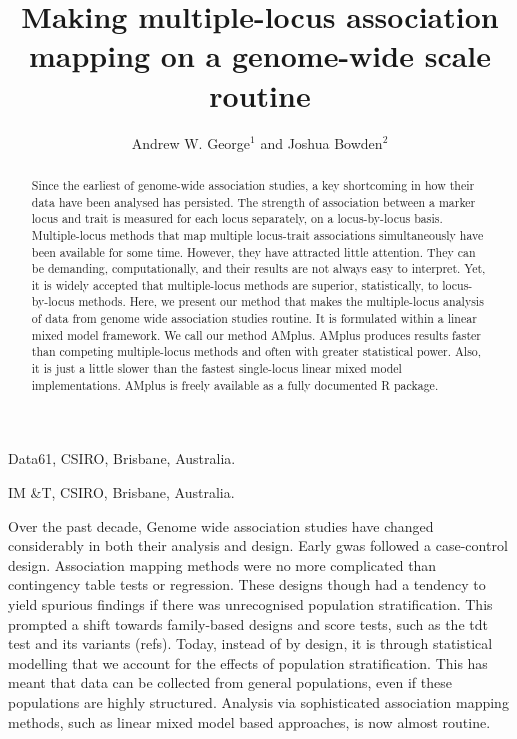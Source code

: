 \documentclass{nature}
\begin{document}
\title{Making multiple-locus association mapping on a genome-wide scale routine}
\author{Andrew W. George$^1$ and Joshua Bowden$^2$}

\maketitle

\begin{affiliations}
\item Data61, CSIRO, Brisbane, Australia.
\item IM \&T, CSIRO, Brisbane, Australia.
\end{affiliations}

\begin{abstract}
Since the earliest of genome-wide association studies, a key shortcoming in how their data have been analysed has persisted. The strength of association between a marker locus and trait is measured for each locus separately, on a locus-by-locus basis. Multiple-locus methods that map multiple locus-trait associations simultaneously have been available for some time. However, they have attracted little attention. They can be demanding, computationally, and their results are not always easy to interpret. Yet, it is widely accepted that multiple-locus methods are superior, statistically, to locus-by-locus methods. Here, we present our method that makes the multiple-locus analysis of data from genome wide association studies routine. It is formulated within a linear mixed model framework. 
We call our method AMplus.  AMplus produces results faster than competing multiple-locus methods and often with greater statistical power. Also, it is just a little slower than the fastest single-locus linear mixed model implementations. 
AMplus is freely available as a fully documented R package. 
\end{abstract}





Over the past decade,  Genome wide association studies have changed considerably in both their analysis and design. Early gwas followed a case-control design. Association mapping methods were no more complicated than contingency table tests or regression. These designs though had a tendency to yield spurious findings if there was unrecognised population stratification. This prompted a shift towards family-based designs and score tests, such as the tdt test and its variants (refs). Today, instead of by design, it is through statistical modelling that we account for the effects of population stratification. This has meant that data can be collected from general populations, even if these populations are highly structured. Analysis via sophisticated association mapping methods, such as linear mixed model based approaches,  is now almost routine.
\end{document}
